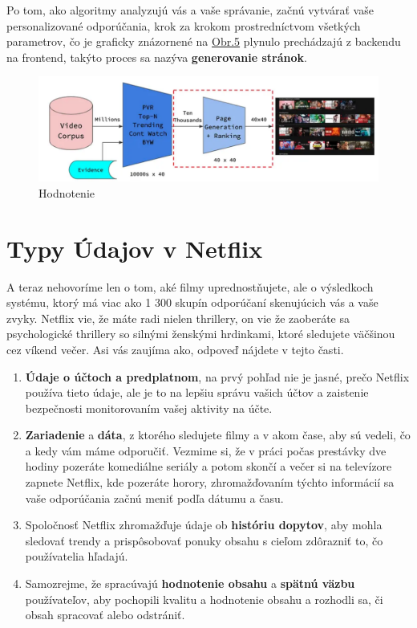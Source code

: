 \documentclass[10pt,slovak,a4paper]{article}
\begin{document}
Po tom, ako algoritmy analyzujú vás a vaše správanie, začnú vytvárať vaše personalizované odporúčania, krok za krokom prostredníctvom všetkých parametrov, čo je graficky znázornené na  \hyperref[Ranking]{Obr.5} plynulo prechádzajú z backendu na frontend, takýto proces sa nazýva \textbf{generovanie stránok}.

\begin{figure}[h!]
  \centering
  \label{Ranking}
  \includegraphics[width=1\textwidth]{Images_tables/Ranking.pdf}
  \caption{Hodnotenie}
\end{figure}

\section{Typy Údajov v Netflix}
A teraz nehovoríme len o tom, aké filmy uprednostňujete, ale o výsledkoch systému, ktorý má viac ako 1 300 skupín odporúčaní skenujúcich vás a vaše zvyky. Netflix vie, že máte radi nielen thrillery, on vie že zaoberáte sa psychologické thrillery so silnými ženskými hrdinkami, ktoré sledujete väčšinou cez víkend večer. Asi vás zaujíma ako, odpoveď nájdete v tejto časti.

\begin{enumerate}
    \item \textbf{Údaje o účtoch a predplatnom}, na prvý pohľad nie je jasné, prečo Netflix používa tieto údaje, ale je to na lepšiu správu vašich účtov a zaistenie bezpečnosti monitorovaním vašej aktivity na účte.

    \item \textbf{Zariadenie} a \textbf{dáta}, z ktorého sledujete filmy a v akom čase, aby sú vedeli, čo a kedy vám máme odporučiť.\cite{Data} Vezmime si, že v práci počas prestávky dve hodiny pozeráte komediálne seriály a potom skončí a večer si na televízore zapnete Netflix, kde pozeráte horory, zhromažďovaním týchto informácií sa vaše odporúčania začnú meniť podľa dátumu a času.

    \item Spoločnosť Netflix zhromažďuje údaje ob  \textbf{históriu dopytov}, aby mohla sledovať trendy a prispôsobovať ponuky obsahu s cieľom zdôrazniť to, čo používatelia hľadajú.

    \item Samozrejme, že spracúvajú \textbf{hodnotenie obsahu} a \textbf{spätnú väzbu} používateľov, aby pochopili kvalitu a hodnotenie obsahu a rozhodli sa, či obsah spracovať alebo odstrániť.
    
\end{enumerate}
\end{document}
